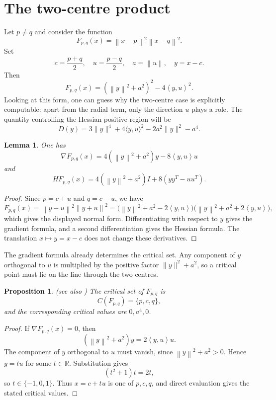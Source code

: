 \documentclass[11pt]{amsart}
\newtheorem{proposition}[theorem]{Proposition}
\newtheorem{lemma}[theorem]{Lemma}
\theoremstyle{remark}
\newcommand{\R}{\mathbb{R}}
\newcommand{\ip}[2]{\left\langle #1,#2\right\rangle}
\newcommand{\norm}[1]{\left\lVert #1\right\rVert}
\begin{document}
\section{The two-centre product}

Let $p\ne q$ and consider the function
\[
 F_{p,q}(x)=\norm{x-p}^2\norm{x-q}^2.
\]
Set
\[
 c=\frac{p+q}{2},\quad u=\frac{p-q}{2},\quad a=\norm{u},\quad y=x-c.
\]
Then
\[
 F_{p,q}(x)=(\norm{y}^2+a^2)^2-4\ip{y}{u}^2.
\]
Looking at this form, one can guess why the two-centre case is explicitly computable:
apart from the radial term, only the direction \(u\) plays a role.  The
quantity controlling the Hessian-positive region will be
\[
D(y)=3\|y\|^4+4\langle y,u\rangle^2-2a^2\|y\|^2-a^4.
\]


\begin{lemma}\label{lem:two-centre-hessian}
One has
\[
 \nabla F_{p,q}(x)=4(\norm{y}^2+a^2)y-8\ip{y}{u}u
\]
and
\[
 HF_{p,q}(x)=4(\norm{y}^2+a^2)I+8(yy^T-uu^T).
\]
\end{lemma}

\begin{proof}
Since $p=c+u$ and $q=c-u$, we have
\[
 F_{p,q}(x)=\norm{y-u}^2\norm{y+u}^2
 =\bigl(\norm{y}^2+a^2-2\ip{y}{u}\bigr)
  \bigl(\norm{y}^2+a^2+2\ip{y}{u}\bigr),
\]
which gives the displayed normal form. Differentiating with respect to $y$
gives the gradient formula, and a second differentiation gives the Hessian
formula. The translation $x\mapsto y=x-c$ does not change these derivatives.
\end{proof}

The gradient formula already determines the critical set.  Any component of
\(y\) orthogonal to \(u\) is multiplied by the positive factor
\(\|y\|^2+a^2\), so a critical point must lie on the line through the two
centres.

\begin{proposition}\label{prop:two-centre-critical-set}(see also \cite[Example 2.1]{BrojbeanuPintea-JCA})
The critical set of $F_{p,q}$ is
\[
 C(F_{p,q})=\{p,c,q\},
\]
and the corresponding critical values are $0,a^4,0$.
\end{proposition}

\begin{proof}
If $\nabla F_{p,q}(x)=0$, then
\[
 (\norm{y}^2+a^2)y=2\ip{y}{u}u.
\]
The component of $y$ orthogonal to $u$ must vanish, since
$\norm{y}^2+a^2>0$. Hence $y=tu$ for some $t\in\R$. Substitution gives
\[
 (t^2+1)t=2t,
\]
so $t\in\{-1,0,1\}$. Thus $x=c+tu$ is one of $p,c,q$, and direct evaluation
gives the stated critical values.
\end{proof}
\end{document}

